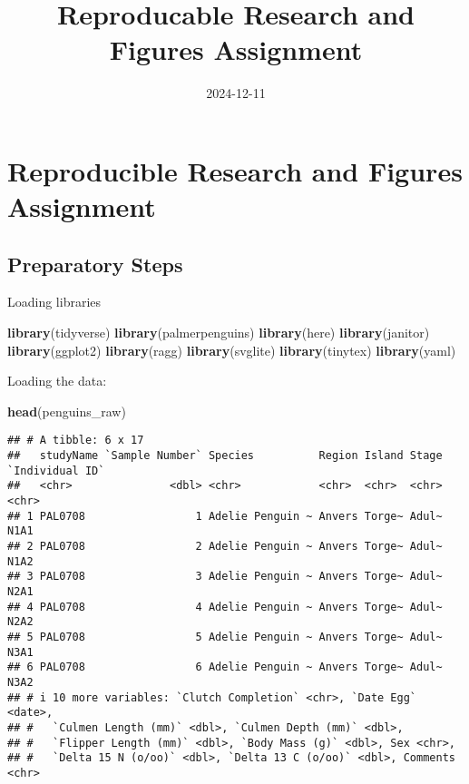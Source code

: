 \documentclass[
]{article}
\title{Reproducable Research and Figures Assignment}
\author{}
\date{\vspace{-2.5em}2024-12-11}
\newenvironment{Shaded}{\begin{snugshade}}{\end{snugshade}}
\newcommand{\FunctionTok}[1]{\textcolor[rgb]{0.13,0.29,0.53}{\textbf{#1}}}
\newcommand{\NormalTok}[1]{#1}
\begin{document}
\maketitle

\section{Reproducible Research and Figures
Assignment}\label{reproducible-research-and-figures-assignment}

\subsection{Preparatory Steps}\label{preparatory-steps}

Loading libraries

\begin{Shaded}
\begin{Highlighting}[]
\FunctionTok{library}\NormalTok{(tidyverse)}
\FunctionTok{library}\NormalTok{(palmerpenguins)}
\FunctionTok{library}\NormalTok{(here)}
\FunctionTok{library}\NormalTok{(janitor)}
\FunctionTok{library}\NormalTok{(ggplot2)}
\FunctionTok{library}\NormalTok{(ragg)}
\FunctionTok{library}\NormalTok{(svglite)}
\FunctionTok{library}\NormalTok{(tinytex)}
\FunctionTok{library}\NormalTok{(yaml)}
\end{Highlighting}
\end{Shaded}

Loading the data:

\begin{Shaded}
\begin{Highlighting}[]
\FunctionTok{head}\NormalTok{(penguins\_raw)}
\end{Highlighting}
\end{Shaded}

\begin{verbatim}
## # A tibble: 6 x 17
##   studyName `Sample Number` Species          Region Island Stage `Individual ID`
##   <chr>               <dbl> <chr>            <chr>  <chr>  <chr> <chr>          
## 1 PAL0708                 1 Adelie Penguin ~ Anvers Torge~ Adul~ N1A1           
## 2 PAL0708                 2 Adelie Penguin ~ Anvers Torge~ Adul~ N1A2           
## 3 PAL0708                 3 Adelie Penguin ~ Anvers Torge~ Adul~ N2A1           
## 4 PAL0708                 4 Adelie Penguin ~ Anvers Torge~ Adul~ N2A2           
## 5 PAL0708                 5 Adelie Penguin ~ Anvers Torge~ Adul~ N3A1           
## 6 PAL0708                 6 Adelie Penguin ~ Anvers Torge~ Adul~ N3A2           
## # i 10 more variables: `Clutch Completion` <chr>, `Date Egg` <date>,
## #   `Culmen Length (mm)` <dbl>, `Culmen Depth (mm)` <dbl>,
## #   `Flipper Length (mm)` <dbl>, `Body Mass (g)` <dbl>, Sex <chr>,
## #   `Delta 15 N (o/oo)` <dbl>, `Delta 13 C (o/oo)` <dbl>, Comments <chr>
\end{verbatim}
\end{document}
